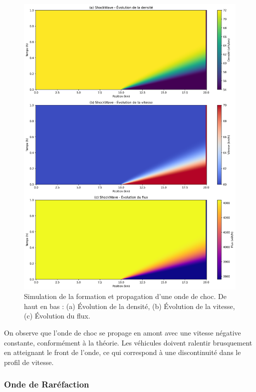\begin{figure}[htbp]
\centering
\includegraphics[width=1.0\textwidth]{simulations/LWR/shock/ShockWave_combined}
\caption{Simulation de la formation et propagation d'une onde de choc. De haut en bas : (a) Évolution de la densité, (b) Évolution de la vitesse, (c) Évolution du flux.}
\label{fig:sim_onde_choc}
\end{figure}

On observe que l'onde de choc se propage en amont avec une vitesse négative constante, conformément à la théorie. Les véhicules doivent ralentir brusquement en atteignant le front de l'onde, ce qui correspond à une discontinuité dans le profil de vitesse.

\subsubsection{Onde de Raréfaction}
\label{subsubsec:rarefaction_sim}

